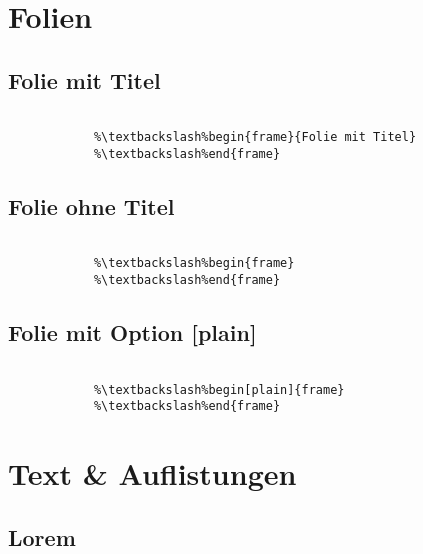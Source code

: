 \section{Folien}

	\subsection{Folie mit Titel}
	\begin{frame}[fragile]{\subsecname}

		\begin{lstlisting}[escapechar=\%]
			%\%% Folie mit Titel

			%\textbackslash%begin{frame}{Folie mit Titel}
			%\textbackslash%end{frame}
		\end{lstlisting}

	\end{frame}

	\subsection{Folie ohne Titel}
	\begin{frame}[fragile]

		\begin{lstlisting}[escapechar=\%]
			%\%% Folie ohne Titel
			
			%\textbackslash%begin{frame}
			%\textbackslash%end{frame}
		\end{lstlisting}
		
	\end{frame}

	\subsection{Folie mit Option [plain]}
	\begin{frame}

		\begin{lstlisting}[escapechar=\%]
			%\%% Folie mit Option [plain]

			%\textbackslash%begin[plain]{frame}
			%\textbackslash%end{frame}
		\end{lstlisting}

	\end{frame}

\section{Text \& Auflistungen}

	\subsection{Lorem}
	\begin{frame}{\subsecname}
		\blindtext
	\end{frame}

